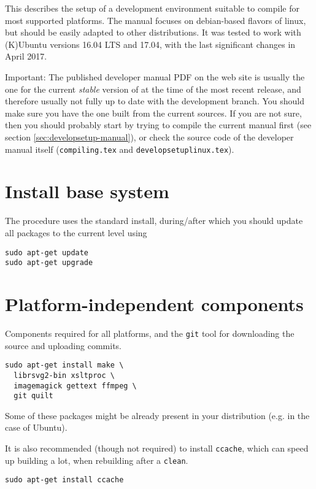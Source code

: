 This describes the setup of a development environment suitable to compile \xc for most supported platforms. The manual focuses on debian-based flavors of linux, but should be easily adapted to other distributions. It was tested to work with (K)Ubuntu versions 16.04 LTS and 17.04, with the last significant changes in April 2017.

\warning Important: The published developer manual PDF on the web site is usually the one for the current \emph{stable} version of \xc at the time of the most recent release, and therefore usually not fully up to date with the development branch.
You should make sure you have the one built from the current sources.
If you are not sure, then you should probably start by trying to compile the current manual first (see section \ref{sec:developsetup-manual}), or check the source code of the developer manual itself (\texttt{compiling.tex} and \texttt{developsetuplinux.tex}).

\section{Install base system}\label{sec:developsetup-base}
The procedure uses the standard install, during/after which you should update all packages to the current level using

\begin{verbatim}
sudo apt-get update
sudo apt-get upgrade
\end{verbatim}

\section{Platform-independent components}\label{sec:developsetup-general}

Components required for all platforms, and the \texttt{git} tool for downloading the source and uploading commits.

\begin{verbatim}
sudo apt-get install make \
  librsvg2-bin xsltproc \
  imagemagick gettext ffmpeg \
  git quilt
\end{verbatim}
Some of these packages might be already present in your distribution (e.g. in the case of Ubuntu).

It is also recommended (though not required) to install \texttt{ccache}, which can speed up building a lot, when rebuilding after a \texttt{clean}.
\begin{verbatim}
sudo apt-get install ccache
\end{verbatim}


